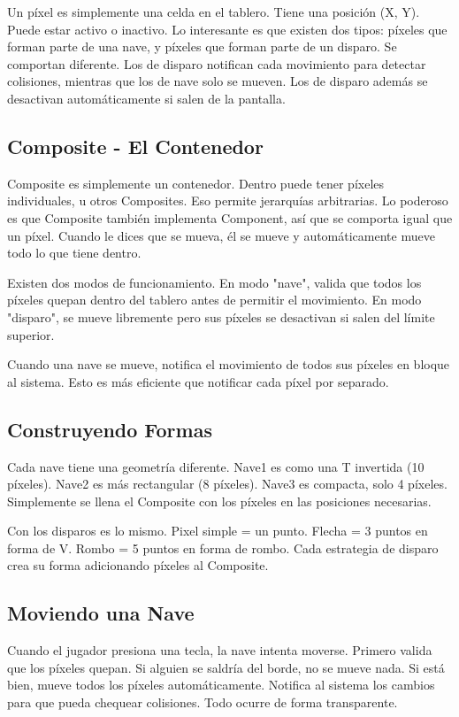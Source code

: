\documentclass[12pt]{article}
\begin{document}
Un píxel es simplemente una celda en el tablero. Tiene una posición (X, Y). Puede estar activo o inactivo. Lo interesante es que existen dos tipos: píxeles que forman parte de una nave, y píxeles que forman parte de un disparo. Se comportan diferente. Los de disparo notifican cada movimiento para detectar colisiones, mientras que los de nave solo se mueven. Los de disparo además se desactivan automáticamente si salen de la pantalla.

\subsection{Composite - El Contenedor}

Composite es simplemente un contenedor. Dentro puede tener píxeles individuales, u otros Composites. Eso permite jerarquías arbitrarias. Lo poderoso es que Composite también implementa Component, así que se comporta igual que un píxel. Cuando le dices que se mueva, él se mueve y automáticamente mueve todo lo que tiene dentro.

Existen dos modos de funcionamiento. En modo "nave", valida que todos los píxeles quepan dentro del tablero antes de permitir el movimiento. En modo "disparo", se mueve libremente pero sus píxeles se desactivan si salen del límite superior.

Cuando una nave se mueve, notifica el movimiento de todos sus píxeles en bloque al sistema. Esto es más eficiente que notificar cada píxel por separado.

\subsection{Construyendo Formas}

Cada nave tiene una geometría diferente. Nave1 es como una T invertida (10 píxeles). Nave2 es más rectangular (8 píxeles). Nave3 es compacta, solo 4 píxeles. Simplemente se llena el Composite con los píxeles en las posiciones necesarias.

Con los disparos es lo mismo. Pixel simple = un punto. Flecha = 3 puntos en forma de V. Rombo = 5 puntos en forma de rombo. Cada estrategia de disparo crea su forma adicionando píxeles al Composite.

\subsection{Moviendo una Nave}

Cuando el jugador presiona una tecla, la nave intenta moverse. Primero valida que los píxeles quepan. Si alguien se saldría del borde, no se mueve nada. Si está bien, mueve todos los píxeles automáticamente. Notifica al sistema los cambios para que pueda chequear colisiones. Todo ocurre de forma transparente.
\end{document}
